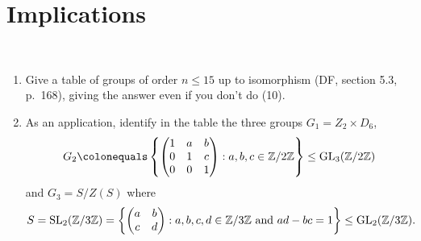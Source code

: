 \section{Implications}~\label{sec:impl}

\begin{Answer}
  \begin{enumerate}
    \item Give a table of groups of order $n\leq 15$ up to isomorphism (DF, section 
    5.3, p.~168), giving the answer even if you don't do (10).
    \item As an application, identify in the table the three groups $G_1=Z_2 \times 
    D_6$, 
    \[ G_2 \colonequals
      \left\{ \begin{pmatrix}
        1 & a & b \\
        0 & 1 & c \\
        0 & 0 & 1
      \end{pmatrix} : a,b,c \in \Z/2\Z \right\} \leq \GL_3(\Z/2\Z) \]
    and $G_3=S/Z(S)$ where  
    \[ S=\operatorname{SL}_2(\mathbb{Z}/3\mathbb{Z})=\left\{ \begin{pmatrix} a & b \\ c & d \end{pmatrix} : a,b,c,d
    \in \mathbb{Z}/3\mathbb{Z} \text{ and } ad-bc=1 \right\} \leq \mathrm{GL}_2(\mathbb{Z}/3\mathbb{Z}). \]
  \end{enumerate}
\end{Answer}
